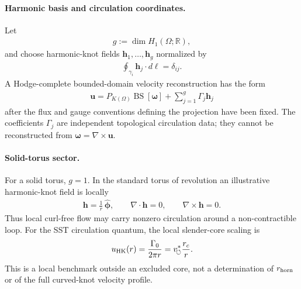     \paragraph{Harmonic basis and circulation coordinates.}
    Let
    \begin{align}
        g
        :=
        \dim H_1(\Omega;\mathbb R),
    \end{align}
    and choose harmonic-knot fields \(\mathbf h_1,\ldots,\mathbf h_g\) normalized by
    \begin{align}
        \oint_{\gamma_i}\mathbf h_j\cdot d\boldsymbol\ell
        =
        \delta_{ij}.
        \label{eq:rt_harmonic_basis_normalization}
    \end{align}
    A Hodge-complete bounded-domain velocity reconstruction has the form
    \begin{align}
        \boxed{
        \mathbf u
        =
        P_{K(\Omega)}\operatorname{BS}[\boldsymbol\omega]
        +
        \sum_{j=1}^{g}\Gamma_j\mathbf h_j
        }
        \label{eq:rt_hodge_complete_velocity}
    \end{align}
    after the flux and gauge conventions defining the projection have been fixed.
    The coefficients \(\Gamma_j\) are independent topological circulation data; they
    cannot be reconstructed from \(\boldsymbol\omega=\nabla\times\mathbf u\).

    \paragraph{Solid-torus sector.}
    For a solid torus, \(g=1\).  In the standard torus of revolution an illustrative
    harmonic-knot field is locally
    \begin{align}
        \mathbf h
        =
        \frac{1}{r}\,\widehat{\boldsymbol\phi},
        \qquad
        \nabla\cdot\mathbf h=0,
        \qquad
        \nabla\times\mathbf h=0.
        \label{eq:rt_solid_torus_harmonic_field}
    \end{align}
    Thus local curl-free flow may carry nonzero circulation around a non-contractible
    loop.  For the SST circulation quantum, the local slender-core scaling is
    \begin{align}
        u_{\rm HK}(r)
        =
        \frac{\Gamma_0}{2\pi r}
        =
        v_{\!\boldsymbol{\circlearrowleft}}^{\ast}\frac{r_c}{r}.
        \label{eq:rt_harmonic_circulation_scaling}
    \end{align}
    This is a local benchmark outside an excluded core, not a determination of
    \(r_{\rm horn}\) or of the full curved-knot velocity profile.

